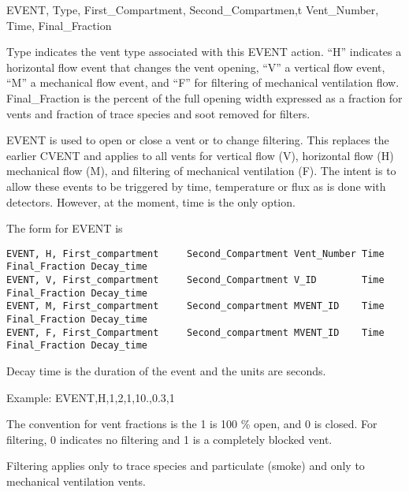 EVENT, Type, First_Compartment, Second_Compartmen,t Vent_Number, Time, Final_Fraction

Type indicates the vent type associated with this EVENT action. ``H'' indicates a horizontal flow event that changes the vent opening, ``V'' a vertical flow event, ``M'' a mechanical flow event, and ``F'' for filtering of mechanical ventilation flow.  Final_Fraction is the percent of the full opening width expressed as a fraction for vents and fraction of trace species and soot removed for filters.

EVENT is used to open or close a vent or to change filtering. This replaces the earlier CVENT and applies to all vents for vertical flow (V), horizontal flow (H) mechanical flow (M), and filtering of mechanical ventilation (F). The intent is to allow these events to be triggered by time, temperature or flux as is done with detectors. However, at the moment, time is the only option.

The form for EVENT is

\begin{lstlisting}
EVENT, H, First_compartment     Second_Compartment Vent_Number Time Final_Fraction Decay_time
EVENT, V, First_compartment     Second_Compartment V_ID        Time Final_Fraction Decay_time
EVENT, M, First_compartment     Second_compartment MVENT_ID    Time Final_Fraction Decay_time
EVENT, F, First_Compartment     Second_compartment MVENT_ID    Time Final_Fraction Decay_time   
\end{lstlisting}

Decay time is the duration of the event and the units are seconds.

Example:
EVENT,H,1,2,1,10.,0.3,1

The convention for vent fractions is the 1 is 100 \% open, and 0 is closed. For filtering, 0 indicates no filtering and 1 is a completely blocked vent. 

Filtering applies only to trace species and particulate (smoke) and only to mechanical ventilation vents.
